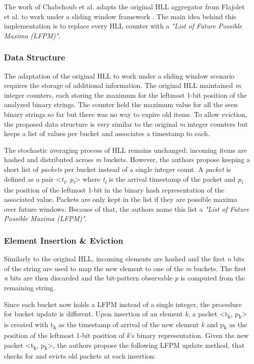 The work of Chabchoub et al. adapts the original HLL aggregator from Flajolet et al. to work under a sliding window framework  \cite{Chabchoub-Sliding-HLL}.
The main idea behind this implementation is to replace every HLL counter with a \textit{"List of Future Possible Maxima (LFPM)"}.

\subsubsection*{Data Structure}

The adaptation of the original HLL to work under a sliding window scenario requires the storage of additional information. The original HLL maintained \textit{m} integer counters, each storing the maximum for the leftmost 1-bit position of the analyzed binary strings.  The counter held the maximum value for all the seen binary strings so far but there was no way to expire old items. To allow eviction, the proposed data structure is very similar to the original \textit{m} integer counters but keeps a list of values per bucket and associates a timestamp to each. 

The stochastic averaging process of HLL remains unchanged: incoming items are hashed and distributed across \textit{m} buckets. However, the authors propose keeping a short list of \textit{packets} per bucket instead of a single integer count. A \textit{packet} is defined as a pair <\textit{t\textsubscript{i}, p\textsubscript{i}}> where \textit{t\textsubscript{i}} is the arrival timestamp of the packet and \textit{p\textsubscript{i}} the position of the leftmost 1-bit in the binary hash representation of the associated value. Packets are only kept in the list if they are possible maxima over future windows. Because of that, the authors name this list a \textit{"List of Future Possible Maxima (LFPM)"}.

\subsubsection*{Element Insertion \& Eviction}
Similarly to the original HLL, incoming elements are hashed and the first \textit{n} bits of the string are used to map the new element to one of the \textit{m} buckets. The first \textit{n} bits are then discarded and the bit-pattern observable \textit{p} is computed from the remaining string. 

Since each bucket now holds a LFPM instead of a single integer, the procedure for bucket update is different. Upon insertion of an element \textit{k}, a packet <t\textsubscript{k}, p\textsubscript{k}> is created with t\textsubscript{k} as the timestamp of arrival of the new element \textit{k} and p\textsubscript{k} as the position of the leftmost 1-bit position of \textit{k}'s binary representation. Given the new packet <t\textsubscript{k}, p\textsubscript{k}>, the authors propose the following LFPM update method, that checks for and evicts old packets at each insertion:

